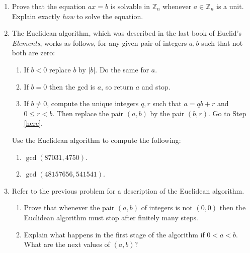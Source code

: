 \documentclass[11pt]{article}
\newenvironment{problems}
{
 \begin{enumerate}[topsep=1pt,itemsep=0pt,parsep=2pt,leftmargin=0.6cm,%
 label={\arabic*.}, ref=\arabic*] \small
}
{
 \end{enumerate}
}
\theoremstyle{definition}
\newcommand{\Z}{\mathbb{Z}} %
\begin{document}
\begin{problems}
\item Prove that the equation $ax=b$ is solvable in $\Z_n$ whenever
    $a \in \Z_n$ is a unit. Explain exactly \emph{how} to solve the
    equation. 



\item The Euclidean algorithm, which was
  described in the last book of Euclid's \emph{Elements}, works as
  follows, for any given pair of integers $a,b$ such that not both are
  zero:
  \begin{enumerate}[label=\arabic*),ref=\arabic*]\sf
  \item If $b < 0$ replace $b$ by $|b|$. Do the same for $a$.
  \item\label{here} If $b=0$ then the gcd is $a$, so return
    $a$ and stop.
  \item If $b \ne 0$, compute the unique integers $q,r$ such that
    $a = qb+r$ and $0 \le r < b$. Then replace the pair $(a,b)$ by the
    pair $(b,r)$. Go to Step \ref{here}.
  \end{enumerate}
  Use the Euclidean algorithm to compute the following:
  \begin{multicols}{2}
  \begin{enumerate}[topsep=0pt,parsep=0pt]
  \item $\gcd(87031, 4750)$.
  \item $\gcd(48157656,541541)$.
  \end{enumerate}
  \end{multicols}

\item Refer to the previous problem for a description of the Euclidean
  algorithm. 
  \begin{enumerate}
  \item Prove that whenever the pair $(a,b)$ of integers is not
    $(0,0)$ then the Euclidean algorithm must stop after finitely many
    steps.
  \item Explain what happens in the first stage of the algorithm if
    $0<a<b$. What are the next values of $(a,b)$?
  \end{enumerate}



\end{problems}
\end{document}
